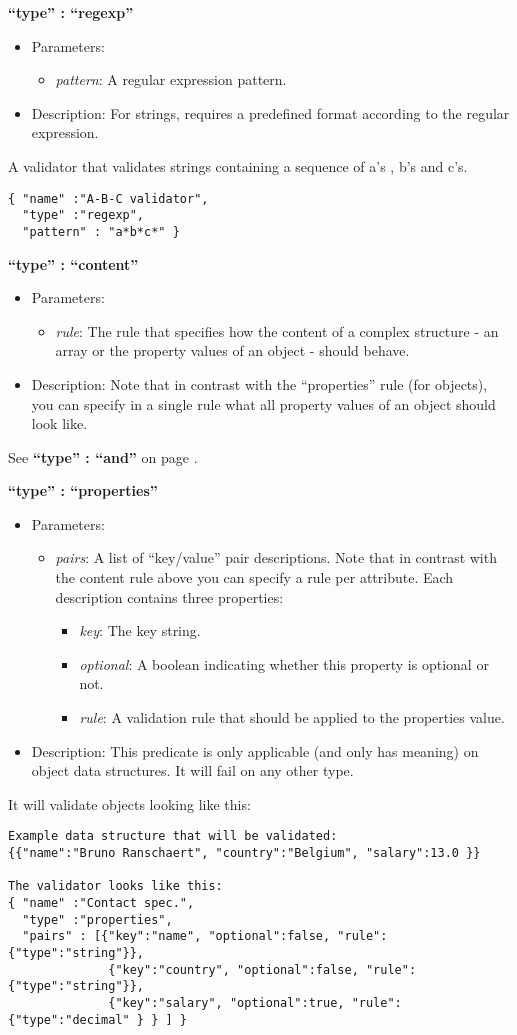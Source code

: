 \documentclass[a4paper]{article}
\newcommand{\ruledef}[3]{
\medskip
\textbf{#1}

\begin{itemize}
\setlength{\itemsep}{1pt}
\setlength{\parskip}{0pt}
\setlength{\parsep}{0pt}
   \item Parameters: #2
   \item Description: #3
\end{itemize}
}
\newcommand{\rulename}[1]{\textbf{``type'' : ``#1''}}
\newcommand{\param}[1]{\textsl{#1}:}
\begin{document}
\ruledef{\rulename{regexp}}{\begin{itemize} \item \param{pattern} A regular expression pattern.\end{itemize}}{For strings, requires a predefined format according to the regular expression.}

A validator that validates strings containing a sequence of a's , b's and c's.

\begin{lstlisting}
{ "name" :"A-B-C validator",
  "type" :"regexp",
  "pattern" : "a*b*c*" }
\end{lstlisting}

\ruledef{\rulename{content}}{\begin{itemize} \item \param{rule} The rule that specifies how the content of a complex structure -  an array or the property values of an object -  should behave. \end{itemize}}{ Note that in contrast with the ``properties'' rule (for objects), you can specify in a single rule what all property values of an object should look like.}

See \rulename{and} on page \pageref{and}. 

\ruledef{\rulename{properties}}{\begin{itemize} \item \param{pairs} A list of ``key/value'' pair descriptions. Note that in contrast with the content rule above you can specify a rule per attribute. Each description contains three properties: \begin{itemize} \item \param{key} The key string. \item \param{optional} A boolean indicating whether this property is optional or not. \item \param{rule} A validation rule that should be applied to the properties value. \end{itemize}  \end{itemize}}{This predicate is only applicable (and only has meaning) on object data structures. It will fail on any other type.}

It will validate objects looking like this:
 
\begin{lstlisting}
Example data structure that will be validated:
{{"name":"Bruno Ranschaert", "country":"Belgium", "salary":13.0 }}

The validator looks like this:
{ "name" :"Contact spec.",
  "type" :"properties",
  "pairs" : [{"key":"name", "optional":false, "rule":{"type":"string"}},
              {"key":"country", "optional":false, "rule":{"type":"string"}},
              {"key":"salary", "optional":true, "rule":{"type":"decimal" } } ] }
\end{lstlisting}
\end{document}

